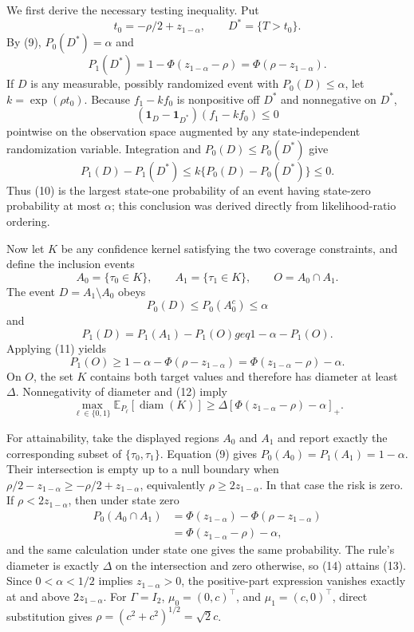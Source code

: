 We first derive the necessary testing inequality. Put
\[
 t_0=-\rho/2+z_{1-\alpha},
 \qquad D^*=\{T>t_0\}.
\]
By (9), \(P_0(D^*)=\alpha\) and
\[
 P_1(D^*)=1-\Phi(z_{1-\alpha}-\rho)=\Phi(\rho-z_{1-\alpha}).
 \tag{10}
\]
If \(D\) is any measurable, possibly randomized event with \(P_0(D)\leq\alpha\), let \(k=\exp(\rho t_0)\). Because \(f_1-kf_0\) is nonpositive off \(D^*\) and nonnegative on \(D^*\),
\[
 (\mathbf 1_D-\mathbf 1_{D^*})(f_1-kf_0)\leq0
\]
pointwise on the observation space augmented by any state-independent randomization variable. Integration and \(P_0(D)\leq P_0(D^*)\) give
\[
 P_1(D)-P_1(D^*)
 \leq k\{P_0(D)-P_0(D^*)\}\leq0.
 \tag{11}
\]
Thus (10) is the largest state-one probability of an event having state-zero probability at most \(\alpha\); this conclusion was derived directly from likelihood-ratio ordering.

Now let \(K\) be any confidence kernel satisfying the two coverage constraints, and define the inclusion events
\[
 A_0=\{\tau_0\in K\},
 \qquad A_1=\{\tau_1\in K\},
 \qquad O=A_0\cap A_1.
\]
The event \(D=A_1\setminus A_0\) obeys
\[
 P_0(D)\leq P_0(A_0^c)\leq\alpha
\]
and
\[
 P_1(D)=P_1(A_1)-P_1(O)geq1-\alpha-P_1(O).
\]
Applying (11) yields
\[
 P_1(O)\geq1-\alpha-\Phi(\rho-z_{1-\alpha})
 =\Phi(z_{1-\alpha}-\rho)-\alpha.
 \tag{12}
\]
On \(O\), the set \(K\) contains both target values and therefore has diameter at least \(\Delta\). Nonnegativity of diameter and (12) imply
\[
 \max_{\ell\in\{0,1\}}
 \mathbb E_{P_\ell}[\operatorname{diam}(K)]
 \geq\Delta[\Phi(z_{1-\alpha}-\rho)-\alpha]_+.
 \tag{13}
\]

For attainability, take the displayed regions \(A_0\) and \(A_1\) and report exactly the corresponding subset of \(\{\tau_0,\tau_1\}\). Equation (9) gives \(P_0(A_0)=P_1(A_1)=1-\alpha\). Their intersection is empty up to a null boundary when
\(
 \rho/2-z_{1-\alpha}\geq-\rho/2+z_{1-\alpha}
\), equivalently \(\rho\geq2z_{1-\alpha}\). In that case the risk is zero. If \(\rho<2z_{1-\alpha}\), then under state zero
\[
\begin{aligned}
 P_0(A_0\cap A_1)
 &=\Phi(z_{1-\alpha})-\Phi(\rho-z_{1-\alpha})\\
 &=\Phi(z_{1-\alpha}-\rho)-\alpha,
\end{aligned}
\tag{14}
\]
and the same calculation under state one gives the same probability. The rule's diameter is exactly \(\Delta\) on the intersection and zero otherwise, so (14) attains (13). Since \(0<\alpha<1/2\) implies \(z_{1-\alpha}>0\), the positive-part expression vanishes exactly at and above \(2z_{1-\alpha}\). For \(\Gamma=I_2\), \(\mu_0=(0,c)^{\top}\), and \(\mu_1=(c,0)^{\top}\), direct substitution gives \(\rho=(c^2+c^2)^{1/2}=\sqrt2c\).

